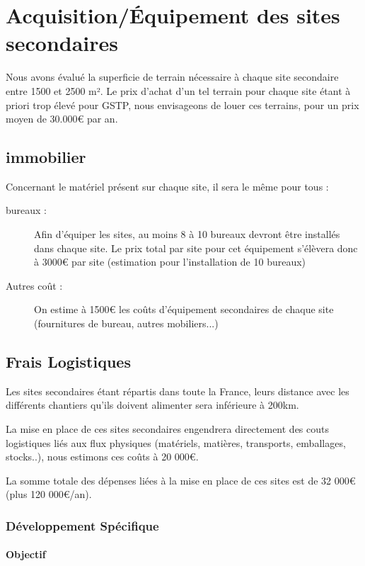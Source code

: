 \section{Acquisition/Équipement des sites secondaires}

    Nous avons évalué la superficie de terrain nécessaire à chaque site secondaire entre 1500 et 2500 m². Le prix d'achat d'un tel terrain pour chaque site étant à priori trop élevé pour GSTP, nous envisageons de louer ces terrains, pour un prix moyen de 30.000€ par an.

    \subsection{immobilier}

        Concernant le matériel présent sur chaque site, il sera le même pour tous : 
        \begin{description}
	        \item[bureaux : ] Afin d'équiper les sites, au moins 8 à 10 bureaux devront être installés dans chaque site. Le prix total par site pour cet équipement s'élèvera donc à 3000€ par site (estimation pour l'installation de 10 bureaux)
	        \item[Autres coût :]  On estime à 1500€ les coûts d'équipement secondaires de chaque site (fournitures de bureau, autres mobiliers...)
        \end{description}

        \subsection{Frais Logistiques}
        Les sites secondaires étant répartis dans toute la France, leurs distance avec les différents chantiers qu'ils doivent alimenter sera inférieure à 200km.

        La mise en place de ces sites secondaires engendrera directement des couts logistiques liés aux flux physiques (matériels, matières, transports, emballages, stocks..), nous estimons ces coûts à 20 000€.

        La somme totale des dépenses liées à la mise en place de ces sites est de 32 000€ (plus 120 000€/an).


        \subsubsection{Développement Spécifique}
        \paragraph{Objectif}

